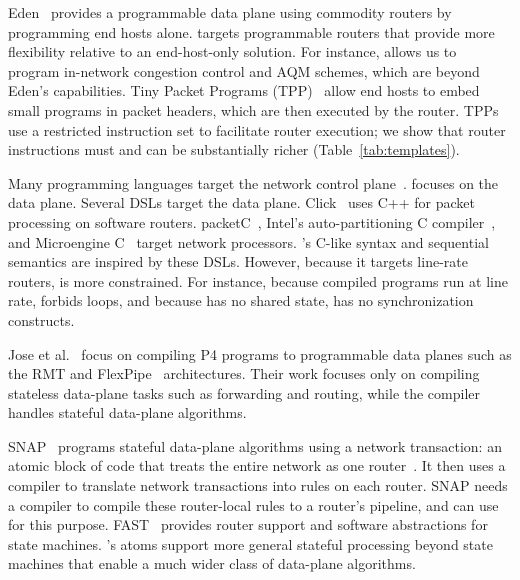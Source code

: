 Eden~\cite{eden} provides a programmable data plane using commodity routers by
programming end hosts alone. \pktlanguage targets programmable routers that
provide more flexibility relative to an end-host-only solution. For instance,
\pktlanguage allows us to program in-network congestion control and AQM
schemes, which are beyond Eden's capabilities.  Tiny Packet Programs
(TPP)~\cite{tpp} allow end hosts to embed small programs in packet headers,
which are then executed by the router. TPPs use a restricted instruction set to
facilitate router execution; we show that router instructions must and can be
substantially richer (Table~\ref{tab:templates}).

 Many programming languages target
the network control plane~\cite{frenetic, maple}. \pktlanguage focuses on the
data plane. Several DSLs target the data plane. Click~\cite{click} uses C++ for
packet processing on software routers. packetC~\cite{packetc}, Intel's
auto-partitioning C compiler~\cite{intel_uiuc_pldi}, and Microengine
C~\cite{microenginec} target network processors. \pktlanguage's C-like syntax
and sequential semantics are inspired by these DSLs. However, because it
targets line-rate routers, \pktlanguage is more constrained. For instance,
because compiled programs run at line rate, \pktlanguage forbids loops, and
because \absmachine has no shared state, \pktlanguage has no synchronization
constructs.

Jose et al.~\cite{lavanya_compiler} focus on compiling P4 programs to
programmable data planes such as the RMT and FlexPipe~\cite{flexpipe} architectures. Their work
focuses only on compiling stateless data-plane tasks such as forwarding and
routing, while the \pktlanguage compiler handles stateful data-plane
algorithms.

SNAP~\cite{snap} programs stateful data-plane algorithms using a network
transaction: an atomic block of code that treats the entire network as one
router~\cite{onebigswitch}. It then uses a compiler to translate network
transactions into rules on each router. SNAP needs a compiler to compile these
router-local rules to a router's pipeline, and can use \pktlanguage for this
purpose. FAST~\cite{fast} provides router support and software abstractions for
state machines. \absmachine's atoms support more general stateful processing
beyond state machines that enable a much wider class of data-plane algorithms.

